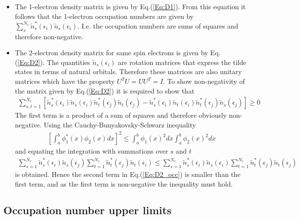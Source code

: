 \documentclass[aip,graphicx]{revtex4-1}
\begin{document}
\begin{itemize}
    \item The 1-electron density matrix is given by Eq.(\ref{Eq:D1}). From this equation it follows that the 1-electron occupation numbers are given by $\sum_s^{N_e}\tilde{n}^*_s(\epsilon_i)\tilde{n}_s(\epsilon_i)$. I.e. the occupation numbers are sums of squares and therefore non-negative. 
    \item The 2-electron density matrix for same spin electrons is given by Eq.(\ref{Eq:D2}). The quantities $\tilde{n}_s(\epsilon_i)$ are rotation matrices that express the tilde states in terms of natural orbitals. Therefore these matrices are also unitary matrices which have the property $U^T U = U U^T = I$. To show non-negativity of the matrix given by Eq.(\ref{Eq:D2}) it is required to show that 
    \begin{eqnarray}
    \label{Eq:D2_occ}
    \sum_{s,t=1}^{N_e}\left[\tilde{n}_s^*(\epsilon_i)\tilde{n}_s(\epsilon_i)\tilde{n}_t^*(\epsilon_j)\tilde{n}_t(\epsilon_j)-\tilde{n}_s^*(\epsilon_i)\tilde{n}_t(\epsilon_i)\tilde{n}_t^*(\epsilon_j)\tilde{n}_s(\epsilon_j)\right] \ge 0
    \end{eqnarray}
    The first term is a product of a sum of squares and therefore obviously non-negative. Using the Cauchy-Bunyakovsky-Schwarz inequality~\cite{Cauchy_1821,Bunyakovsky_1859,Schwarz_1888}
    \begin{eqnarray}
    \left[\int_a^b\phi^*_1(x)\phi_2(x)dx\right]^2 \le \int_a^b \phi_1(x)^2 dx \int_a^b\phi_2(x)^2 dx 
    \end{eqnarray}
    and equating the integration with summations over $s$ and $t$ 
    \begin{eqnarray}
    \sum_{s=1}^{N_e}\tilde{n}^*_s(\epsilon_i)\tilde{n}_s(\epsilon_j)\sum_{t=1}^{N_e}\tilde{n}^*_t(\epsilon_j)\tilde{n}_t(\epsilon_i) \le \sum_{s=1}^{N_e}\tilde{n}^*_s(\epsilon_i)\tilde{n}_s(\epsilon_i)\sum_{t=1}^{N_e}\tilde{n}^*_t(\epsilon_j)\tilde{n}_t(\epsilon_j)
    \end{eqnarray}
    is obtained. Hence the second term in Eq.(\ref{Eq:D2_occ}) is smaller than the first term, and as the first term is non-negative the inequality must hold.
\end{itemize}

\subsection{Occupation number upper limits}
\end{document}
